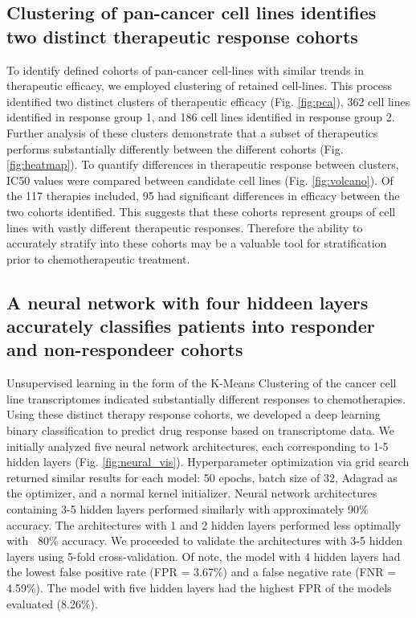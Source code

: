 \documentclass[10pt, letterpaper]{article}
\begin{document}
\begin{multicols}{2}
\subsection*{Clustering of pan-cancer cell lines identifies two distinct therapeutic response cohorts}
To identify defined cohorts of pan-cancer cell-lines with similar trends in therapeutic efficacy, we employed clustering of retained cell-lines. This process identified two distinct clusters of therapeutic efficacy (Fig. \ref{fig:pca}), 362 cell lines identified in response group 1, and 186 cell lines identified in response group 2.  Further analysis of these clusters demonstrate that a subset of therapeutics performs substantially differently between the different cohorts (Fig. \ref{fig:heatmap}). To quantify differences in therapeutic response between clusters, IC50 values were compared between candidate cell lines (Fig. \ref{fig:volcano}). Of the 117 therapies included, 95 had significant differences in efficacy between the two cohorts identified. This suggests that these cohorts represent groups of cell lines with vastly different therapeutic responses. Therefore the ability to accurately stratify into these cohorts may be a valuable tool for stratification prior to chemotherapeutic treatment.

\subsection*{A neural network with four hiddeen layers accurately classifies patients into responder and non-respondeer cohorts}
Unsupervised learning in the form of the K-Means Clustering of the cancer cell line transcriptomes indicated substantially different responses to chemotherapies. Using these distinct therapy response cohorts, we developed a deep learning binary classification to predict drug response based on transcriptome data. We initially analyzed five neural network architectures, each corresponding to 1-5 hidden layers (Fig. \ref{fig:neural_vis}). Hyperparameter optimization via grid search returned similar results for each model: 50 epochs, batch size of 32, Adagrad as the optimizer, and a normal kernel initializer. Neural network architectures containing 3-5 hidden layers performed similarly with approximately 90\% accuracy. The architectures with 1 and 2 hidden layers performed less optimally with ~80\% accuracy. We proceeded to validate the architectures with 3-5 hidden layers using 5-fold cross-validation. Of note, the model with 4 hidden layers had the lowest false positive rate (FPR = 3.67\%) and a false negative rate (FNR = 4.59\%). The model with five hidden layers had the highest FPR of the models evaluated (8.26\%).


\end{multicols}
\end{document}
